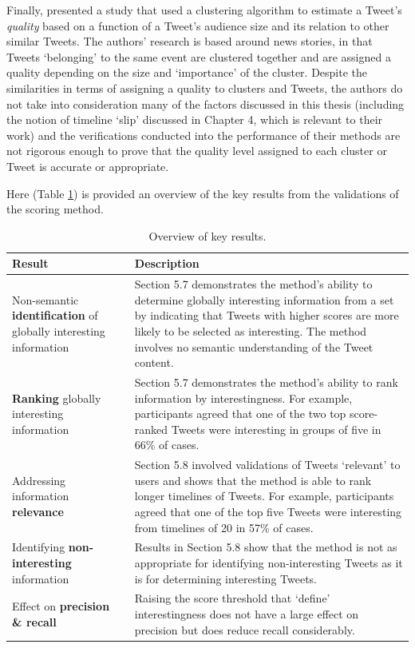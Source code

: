 Finally, \citet{lauw10} presented a study that used a clustering algorithm to estimate a Tweet's \textit{quality} based on a function of a Tweet's audience size and its relation to other similar Tweets. The authors' research is based around news stories, in that Tweets `belonging' to the same event are clustered together and are assigned a quality depending on the size and `importance' of the cluster. Despite the similarities in terms of assigning a quality to clusters and Tweets, the authors do not take into consideration many of the factors discussed in this thesis (including the notion of timeline `slip' discussed in Chapter 4, which is relevant to their work) and the verifications conducted into the performance of their methods are not rigorous enough to prove that the quality level assigned to each cluster or Tweet is accurate or appropriate.

Here (Table \ref{table:final_overview}) is provided an overview of the key results from the validations of the scoring method.

\begin{table}[H]\footnotesize
    \begin{tabular}{p{} | p{}}
        Result & Description\\
        \hline
        \hline
        Non-semantic \textbf{identification} of globally interesting information & Section 5.7 demonstrates the method's ability to determine globally interesting information from a set by indicating that Tweets with higher scores are more likely to be selected as interesting. The method involves no semantic understanding of the Tweet content.\\
        \hline
        \textbf{Ranking} globally interesting information & Section 5.7 demonstrates the method's ability to rank information by interestingness. For example, participants agreed that one of the two top score-ranked Tweets were interesting in groups of five in 66\% of cases.\\
        \hline   
        Addressing information \textbf{relevance} & Section 5.8 involved validations of Tweets `relevant' to users and shows that the method is able to rank longer timelines of Tweets. For example, participants agreed that one of the top five Tweets were interesting from timelines of 20 in 57\% of cases.\\
        \hline
        Identifying \textbf{non-interesting} information & Results in Section 5.8 show that the method is not as appropriate for identifying non-interesting Tweets as it is for determining interesting Tweets.\\
        \hline
        Effect on \textbf{precision \& recall} & Raising the score threshold that `define' interestingness does not have a large effect on precision but does reduce recall considerably.\\
        \hline
    \end{tabular}
\caption{Overview of key results.}
\label{table:final_overview}
\end{table}

